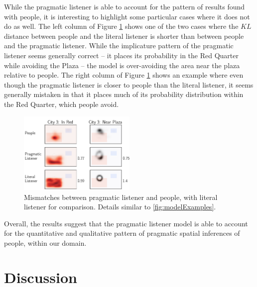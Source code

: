 \documentclass[10pt,letterpaper]{article}
\begin{document}
While the pragmatic listener is able to account for the pattern of results found with people, it is interesting to highlight some particular cases where it does not do as well. The left column of Figure \ref{fig:modelProbs} shows one of the two cases where the $KL$ distance between people and the literal listener is shorter than between people and the pragmatic listener.  While the implicature pattern of the pragmatic listener seems generally correct -- it places its probability in the Red Quarter while avoiding the Plaza -- the model is over-avoiding the area near the plaza relative to people. The right column of Figure \ref{fig:modelProbs} shows an example where even though the pragmatic listener is closer to people than the literal listener, it seems generally mistaken in that it places much of its probability distribution within the Red Quarter, which people avoid. 

\begin{figure}[!h]
\center
\includegraphics[width=0.5\textwidth]{figures/Figure5.png}
\caption{Mismatches between pragmatic listener and people, with literal listener for comparison. Details similar to \ref{fig:modelExamples}.}
\label{fig:modelProbs}
\end{figure}

Overall, the results suggest that the pragmatic listener model is able to account for the quantitative and qualitative pattern of pragmatic spatial inferences of people, within our domain.  

\section{Discussion}
\end{document}
